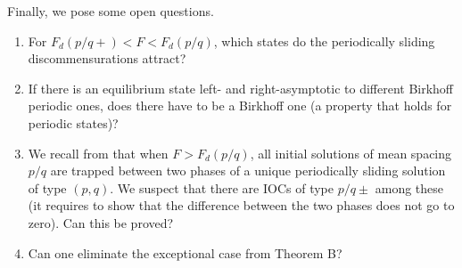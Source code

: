 \documentclass[12pt]{article}
\newcommand{\R}{\mathbb{R}}
\newcommand{\Z}{\mathbb{Z}}
\begin{document}
Finally, we pose some open questions.
\begin{enumerate}
\item For $F_d(p/q+)<F<F_d(p/q)$,  which states do the periodically sliding discommensurations attract?

\item  If there is an equilibrium state left- and right-asymptotic to different Birkhoff periodic ones, does there have to be a Birkhoff one (a property that holds for periodic states)?

\item We recall from \cite{BM} that when $F>F_d(p/q)$, all initial solutions of mean spacing $p/q$ are trapped between two phases of a unique periodically sliding solution of type $(p,q)$.  We suspect that there are IOCs of type $p/q\pm$ among these (it requires to show that the difference between the two phases does not go to zero).  Can this be proved?

\item Can one eliminate the exceptional case from Theorem B?
\end{enumerate}





\end{document}
